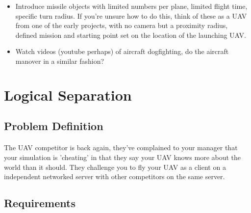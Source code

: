 \documentclass[11pt]{book}
\begin{document}
\begin{itemize}
\item Introduce missile objects with limited numbers per plane, limited flight time, specific turn radius. If you're unsure how to do this, think of these as a UAV from one of the early projects, with no camera but a proximity radius, defined mission and starting point set on the location of the launching UAV.
\item Watch videos (youtube perhaps) of aircraft dogfighting, do the aircraft manover in a similar fashion?
\end{itemize}

\clearpage



\section{Logical Separation}

\subsection{Problem Definition}

\paragraph{} The UAV competitor is back again, they've complained to your manager that your simulation is 'cheating' in that they say your UAV knows more about the world than it should. They challenge you to fly your UAV as a client on a independent networked server with other competitors on the same server.

\subsection{Requirements}
\end{document}
